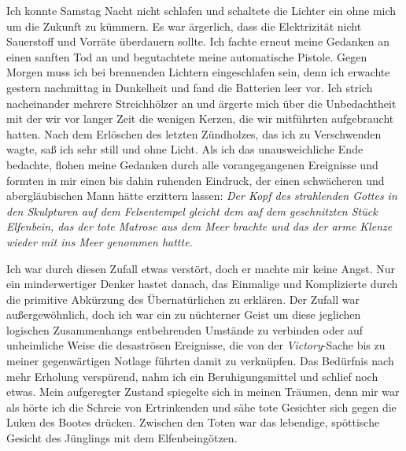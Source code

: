 \documentclass[a4paper]{memoir}
\begin{document}
Ich konnte Samstag Nacht nicht schlafen und schaltete die Lichter ein ohne mich um die Zukunft zu kümmern. Es war ärgerlich, dass die Elektrizität nicht Sauerstoff und Vorräte überdauern sollte. Ich fachte erneut meine Gedanken an einen sanften Tod an und begutachtete meine automatische Pistole. Gegen Morgen muss ich bei brennenden Lichtern eingeschlafen sein, denn ich erwachte gestern nachmittag in Dunkelheit und fand die Batterien leer vor. Ich strich nacheinander mehrere Streichhölzer an und ärgerte mich über die Unbedachtheit mit der wir vor langer Zeit die wenigen Kerzen, die wir mitführten aufgebraucht hatten.
Nach dem Erlöschen des letzten Zündholzes, das ich zu Verschwenden wagte, saß ich sehr still und ohne Licht. Als ich das unausweichliche Ende bedachte, flohen meine Gedanken durch alle vorangegangenen Ereignisse und formten in mir einen bis dahin ruhenden Eindruck, der einen schwächeren und abergläubischen Mann hätte erzittern lassen: \textit{Der Kopf des strahlenden Gottes in den Skulpturen auf dem Felsentempel gleicht dem auf dem geschnitzten Stück Elfenbein, das der tote Matrose aus dem Meer brachte und das der arme Klenze wieder mit ins Meer genommen hattte.}

Ich war durch diesen Zufall etwas verstört, doch er machte mir keine Angst. Nur ein minderwertiger Denker hastet danach, das Einmalige und Komplizierte durch die primitive Abkürzung des Übernatürlichen zu erklären. Der Zufall war außergewöhnlich, doch ich war ein zu nüchterner Geist um diese jeglichen logischen Zusammenhangs entbehrenden Umstände zu verbinden oder auf unheimliche Weise die desaströsen Ereignisse, die von der \textit{Victory}-Sache bis zu meiner gegenwärtigen Notlage führten damit zu verknüpfen. Das Bedürfnis nach mehr Erholung verspürend, nahm ich ein Beruhigungsmittel und schlief noch etwas. Mein aufgeregter Zustand spiegelte sich in meinen Träumen, denn mir war als hörte ich die Schreie von Ertrinkenden und sähe tote Gesichter sich gegen die Luken des Bootes drücken. Zwischen den Toten war das lebendige, spöttische Gesicht des Jünglings mit dem Elfenbeingötzen.
\end{document}
